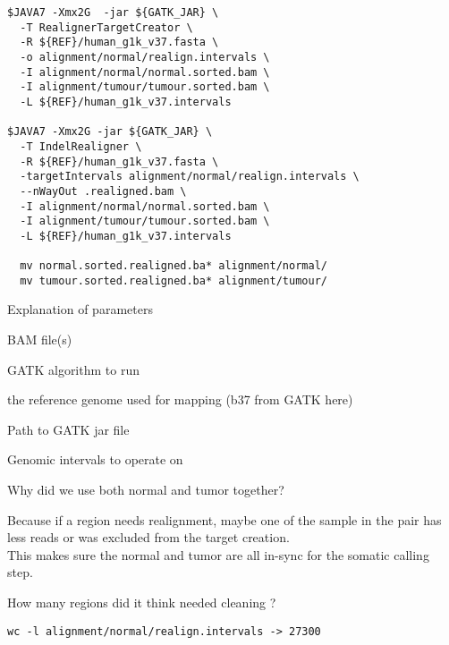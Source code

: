 \begin{lstlisting}
$JAVA7 -Xmx2G  -jar ${GATK_JAR} \
  -T RealignerTargetCreator \
  -R ${REF}/human_g1k_v37.fasta \
  -o alignment/normal/realign.intervals \
  -I alignment/normal/normal.sorted.bam \
  -I alignment/tumour/tumour.sorted.bam \
  -L ${REF}/human_g1k_v37.intervals

$JAVA7 -Xmx2G -jar ${GATK_JAR} \
  -T IndelRealigner \
  -R ${REF}/human_g1k_v37.fasta \
  -targetIntervals alignment/normal/realign.intervals \
  --nWayOut .realigned.bam \
  -I alignment/normal/normal.sorted.bam \
  -I alignment/tumour/tumour.sorted.bam \
  -L ${REF}/human_g1k_v37.intervals

  mv normal.sorted.realigned.ba* alignment/normal/
  mv tumour.sorted.realigned.ba* alignment/tumour/
\end{lstlisting}


\begin{note}
Explanation of parameters
\begin{description}[style=multiline,labelindent=0cm,align=right,leftmargin=\descriptionlabelspace,rightmargin=1.5cm,font=\ttfamily]
 \item[-I] BAM file(s)
 \item[-T] GATK algorithm to run
 \item[-R] the reference genome used for mapping (b37 from GATK here)
 \item[-jar] Path to GATK jar file
 \item[-L] Genomic intervals to operate on
\end{description}
\end{note}

\begin{questions} 
Why did we use both normal and tumor together?
\end{questions}
\begin{answer}
Because if a region needs realignment, maybe one of the sample in the pair has less reads or was excluded from the target creation. \\
This makes sure the normal and tumor are all in-sync for the somatic calling step. 
\end{answer}

\begin{questions} 
How many regions did it think needed cleaning ? 
\end{questions}
\begin{answer}
\begin{lstlisting}
wc -l alignment/normal/realign.intervals -> 27300
\end{lstlisting}
\end{answer}

